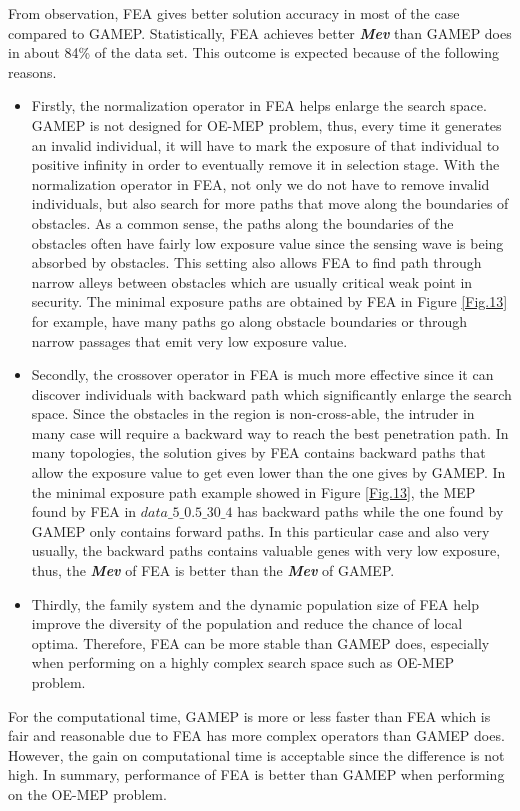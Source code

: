 \documentclass[final]{elsarticle}
\begin{document}
From observation, FEA gives better solution accuracy in most of the case compared to GAMEP. Statistically, FEA achieves better \textit{\textbf{Mev}} than GAMEP does in about 84\% of the data set. This outcome is expected because of  the following reasons.
\begin{itemize}
	\item Firstly, the normalization operator in FEA helps enlarge the search space. GAMEP is not designed for OE-MEP problem, thus, every time it generates an invalid individual, it will have to mark the exposure of that individual to positive infinity in order to eventually remove it in selection stage. With the normalization operator in FEA, not only we do not have to remove invalid individuals, but also search for more paths that move along the boundaries of obstacles. As a common sense, the paths along the boundaries of the obstacles often have fairly low exposure value since the sensing wave is being absorbed by obstacles. This setting also allows FEA to find path through narrow alleys between obstacles which are usually critical weak point in security. The minimal exposure paths are obtained by FEA in Figure \ref{Fig.13} for example, have many paths go along obstacle boundaries or through narrow passages that emit very low exposure value.
	\item Secondly, the crossover operator in FEA is much more effective since it can discover individuals with backward path which significantly enlarge the search space. Since the obstacles in the region is non-cross-able, the intruder in many case will require a backward way to reach the best penetration path. In many topologies, the solution gives by FEA contains backward paths that allow the exposure value to get even lower than the one gives by GAMEP. In the minimal exposure path example showed in Figure \ref{Fig.13}, the MEP found by FEA in $data\_5\_0.5\_30\_4 $ has backward paths while the one found by GAMEP only contains forward paths. In this particular case and also very usually, the backward paths contains valuable genes with very low exposure, thus, the \textbf{\textit{Mev}} of FEA is better than the \textbf{\textit{Mev}} of GAMEP. 
	\item Thirdly, the family system and the dynamic population size of FEA help improve the diversity of the population and reduce the chance of local optima. Therefore, FEA can be more stable than GAMEP does, especially when performing on a highly complex search space such as OE-MEP problem. 
\end{itemize}
For the computational time, GAMEP is more or less faster than FEA which is fair and reasonable due to FEA has more complex operators than GAMEP does. However, the gain on computational time is acceptable since the difference is not high. In summary, performance of FEA is better than GAMEP when performing on the OE-MEP problem. 
\end{document}
